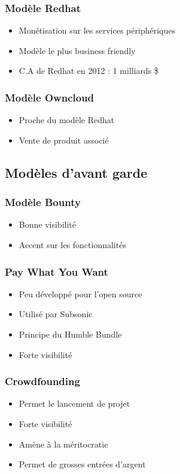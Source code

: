 \begin{frame}
\frametitle{Modèle Redhat}

\begin{itemize}
    \itemsep1.5em
    \item Monétisation sur les services périphériques
    \item Modèle le plus business friendly
    \item C.A de Redhat en 2012 : 1 milliards \${}
\end{itemize}
\end{frame}


\begin{frame}
\frametitle{Modèle Owncloud}

\begin{itemize}
    \itemsep1.5em
    \item Proche du modèle Redhat
    \item Vente de produit associé
\end{itemize}
\end{frame}


    \subsection{Modèles d'avant garde}


\begin{frame}
\frametitle{Modèle Bounty}

\begin{itemize}
    \itemsep1.5em
    \item Bonne visibilité
    \item Accent sur les fonctionnalités
\end{itemize}
\end{frame}


\begin{frame}
\frametitle{Pay What You Want}

\begin{itemize}
    \itemsep1.5em
    \item Peu développé pour l'open source
    \item Utilisé par Subsonic
    \item Principe du Humble Bundle
    \item Forte visibilité
\end{itemize}
\end{frame}


\begin{frame}
\frametitle{Crowdfounding}

\begin{itemize}
    \itemsep1.5em
    \item Permet le lancement de projet
    \item Forte visibilité
    \item Amène à la méritocratie
    \item Permet de grosses entrées d'argent
\end{itemize}
\end{frame}


